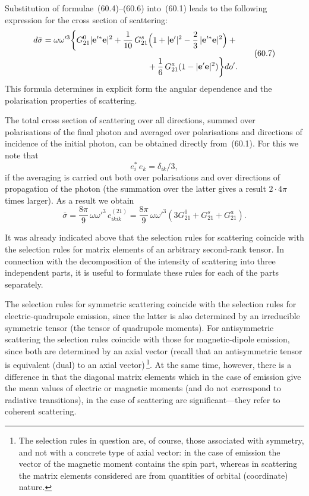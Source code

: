 Substitution of formulae~(60.4)--(60.6) into~(60.1) leads to the following expression for the cross section of scattering:
\begin{equation}
\begin{split}
d\bar{\sigma} = \omega\omega'^3\biggl\{G^0_{21}|\mathbf{e}'^*\mathbf{e}|^2 + \frac{1}{10}\,G^s_{21}\Bigl(1 + |\mathbf{e}'|^2 - \frac{2}{3}\,|\mathbf{e}'^*\mathbf{e}|^2\Bigr) +{}\\[4pt]
{}+ \frac{1}{6}\,G^a_{21}(1 - |\mathbf{e}'\mathbf{e}|^2)\biggr\}do'.
\end{split}
\tag{60.7}
\end{equation}
This formula determines in explicit form the angular dependence and the polarisation properties of scattering.

The total cross section of scattering over all directions, summed over polarisations of the final photon and averaged over polarisations and directions of incidence of the initial photon, can be obtained directly from~(60.1). For this we note that
\[
e^*_i\,e_k = \delta_{ik}/3,
\]
if the averaging is carried out both over polarisations and over directions of propagation of the photon (the summation over the latter gives a result $2 \cdot 4\pi$ times larger). As a result we obtain
\begin{equation}
\bar{\sigma} = \frac{8\pi}{9}\,\omega\omega'^3\,c^{(21)}_{ikik} = \frac{8\pi}{9}\,\omega\omega'^3(3G^0_{21} + G^s_{21} + G^a_{21}).
\tag{60.8}
\end{equation}

It was already indicated above that the selection rules for scattering coincide with the selection rules for matrix elements of an arbitrary second-rank tensor. In connection with the decomposition of the intensity of scattering into three independent parts, it is useful to formulate these rules for each of the parts separately.

The selection rules for symmetric scattering coincide with the selection rules for electric-quadrupole emission, since the latter is also determined by an irreducible symmetric tensor (the tensor of quadrupole moments). For antisymmetric scattering the selection rules coincide with those for magnetic-dipole emission, since both are determined by an axial vector (recall that an antisymmetric tensor is equivalent (dual) to an axial vector)\,\footnote{The selection rules in question are, of course, those associated with symmetry, and not with a concrete type of axial vector: in the case of emission the vector of the magnetic moment contains the spin part, whereas in scattering the matrix elements considered are from quantities of orbital (coordinate) nature.}. At the same time, however, there is a difference in that the diagonal matrix elements which in the case of emission give the mean values of electric or magnetic moments (and do not correspond to radiative transitions), in the case of scattering are significant---they refer to coherent scattering.

